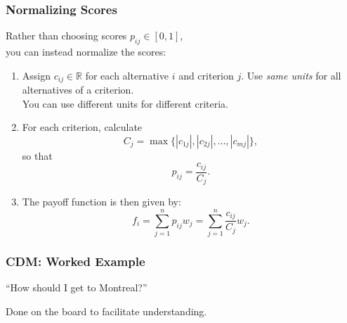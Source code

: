 \begin{frame}

\frametitle{Normalizing Scores}

\begin{changemargin}{1cm}

 Rather than choosing scores
$p_{ij} \in [0, 1]$, \\
you can instead normalize the scores:
\begin{enumerate}
\item Assign $c_{ij} \in \mathbb{R}$ for each alternative $i$ and criterion $j$.
Use \emph{same units} for all alternatives of a 
 criterion. \\ You can use different units for different criteria.
\item For each criterion, calculate
\[ C_j = \max \{ |c_{1j}|, |c_{2j}|, \ldots, |c_{mj}| \}, \]
so that
\[ p_{ij} = \frac{c_{ij}}{C_j}. \]
\item The payoff function is then given by:
\[ f_i = \sum_{j=1}^n p_{ij} w_j = \sum_{j=1}^n \frac{c_{ij}}{C_j}  w_j. \]
\end{enumerate}

\end{changemargin}

\end{frame}

\begin{frame}
\frametitle{CDM: Worked Example}

\begin{changemargin}{1cm}
``How should I get to Montreal?''

Done on the board to facilitate understanding.

\end{changemargin}

\end{frame}

